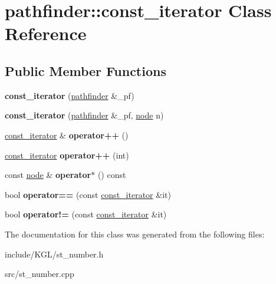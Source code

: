 \hypertarget{classpathfinder_1_1const__iterator}{}\section{pathfinder\+:\+:const\+\_\+iterator Class Reference}
\label{classpathfinder_1_1const__iterator}
\subsection*{Public Member Functions}
\begin{DoxyCompactItemize}
\item 
\mbox{\label{classpathfinder_1_1const__iterator_a8766a7016c300cbbe9c5f8fa61ec44d1}} 
{\bfseries const\+\_\+iterator} (\mbox{\hyperlink{classpathfinder}{pathfinder}} \&\+\_\+pf)
\item 
\mbox{\label{classpathfinder_1_1const__iterator_acbaabfa04503076ff34db02d03c2e05e}} 
{\bfseries const\+\_\+iterator} (\mbox{\hyperlink{classpathfinder}{pathfinder}} \&\+\_\+pf, \mbox{\hyperlink{classnode}{node}} n)
\item 
\mbox{\label{classpathfinder_1_1const__iterator_acc71bfba7f3318446d97cf058871b015}} 
\mbox{\hyperlink{classpathfinder_1_1const__iterator}{const\+\_\+iterator}} \& {\bfseries operator++} ()
\item 
\mbox{\label{classpathfinder_1_1const__iterator_a1ed8257e9acb6d55cfc49753a134ac9f}} 
\mbox{\hyperlink{classpathfinder_1_1const__iterator}{const\+\_\+iterator}} {\bfseries operator++} (int)
\item 
\mbox{\label{classpathfinder_1_1const__iterator_a71d37d3c7f9e5301eaa5fe995877613a}} 
const \mbox{\hyperlink{classnode}{node}} \& {\bfseries operator$\ast$} () const
\item 
\mbox{\label{classpathfinder_1_1const__iterator_aa4ed66f83b966672c7beb112d1266459}} 
bool {\bfseries operator==} (const \mbox{\hyperlink{classpathfinder_1_1const__iterator}{const\+\_\+iterator}} \&it)
\item 
\mbox{\label{classpathfinder_1_1const__iterator_a350c813ed1fbaa12cb90e459819894d0}} 
bool {\bfseries operator!=} (const \mbox{\hyperlink{classpathfinder_1_1const__iterator}{const\+\_\+iterator}} \&it)
\end{DoxyCompactItemize}


The documentation for this class was generated from the following files\+:\begin{DoxyCompactItemize}
\item 
include/\+K\+G\+L/st\+\_\+number.\+h\item 
src/st\+\_\+number.\+cpp\end{DoxyCompactItemize}
